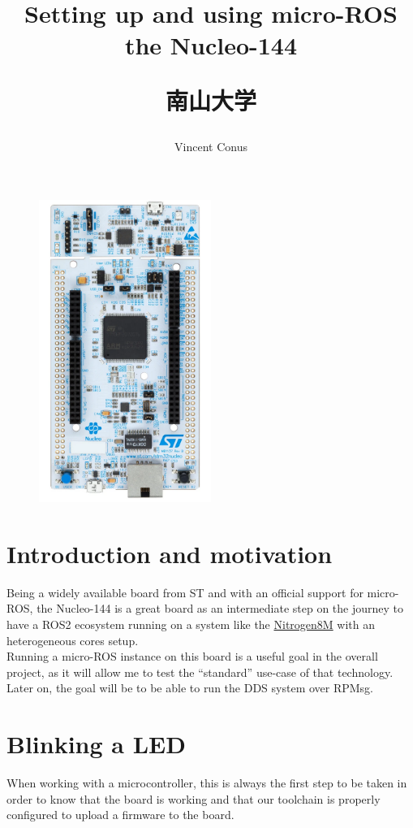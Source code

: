 \documentclass[10pt]{article}
\title{Setting up and using micro-ROS the Nucleo-144 \\[1ex] \large \begin{CJK}{UTF8}{min}南山大学\end{CJK}}
\date{}
\author{Vincent Conus}
\begin{document}
 
\maketitle

\begin{figure}[h]
  \centering
  \includegraphics[width=0.5\textwidth]{./img/board.png}
\end{figure}

\pagebreak
\section{Introduction and motivation}
Being a widely available board from ST and with an official support for micro-ROS, the Nucleo-144 is a great board as an intermediate step on the journey to have a ROS2 ecosystem running on a system like the \href{https://gitlab.com/nitrogen8m/documentation}{Nitrogen8M} with an heterogeneous cores setup.\\
Running a micro-ROS instance on this board is a useful goal in the overall project, as it will
allow me to test the ``standard'' use-case of that technology.\\
Later on, the goal will be to be able to run the DDS system over RPMsg.

\section{Blinking a LED}
\label{sec:blinking-led}
When working with a microcontroller, this is always the first step to be taken
in order to know that the board is working and that our toolchain is properly
configured to upload a firmware to the board.
\end{document}
